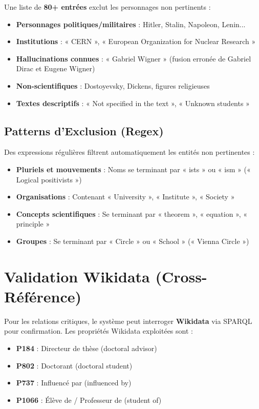 \documentclass[12pt,a4paper]{report}
\begin{document}
Une liste de \textbf{80+ entrées} exclut les personnages non pertinents :

\begin{itemize}
    \item \textbf{Personnages politiques/militaires} : Hitler, Stalin, Napoleon, Lenin...
    \item \textbf{Institutions} : « CERN », « European Organization for Nuclear Research »
    \item \textbf{Hallucinations connues} : « Gabriel Wigner » (fusion erronée de Gabriel Dirac et Eugene Wigner)
    \item \textbf{Non-scientifiques} : Dostoyevsky, Dickens, figures religieuses
    \item \textbf{Textes descriptifs} : « Not specified in the text », « Unknown students »
\end{itemize}

\subsection{Patterns d'Exclusion (Regex)}

Des expressions régulières filtrent automatiquement les entités non pertinentes :

\begin{itemize}
    \item \textbf{Pluriels et mouvements} : Noms se terminant par « ists » ou « ism » (« Logical positivists »)
    \item \textbf{Organisations} : Contenant « University », « Institute », « Society »
    \item \textbf{Concepts scientifiques} : Se terminant par « theorem », « equation », « principle »
    \item \textbf{Groupes} : Se terminant par « Circle » ou « School » (« Vienna Circle »)
\end{itemize}

\section{Validation Wikidata (Cross-Référence)}

Pour les relations critiques, le système peut interroger \textbf{Wikidata} via SPARQL pour confirmation. Les propriétés Wikidata exploitées sont :

\begin{itemize}
    \item \textbf{P184} : Directeur de thèse (doctoral advisor)
    \item \textbf{P802} : Doctorant (doctoral student)
    \item \textbf{P737} : Influencé par (influenced by)
    \item \textbf{P1066} : Élève de / Professeur de (student of)
\end{itemize}
\end{document}

